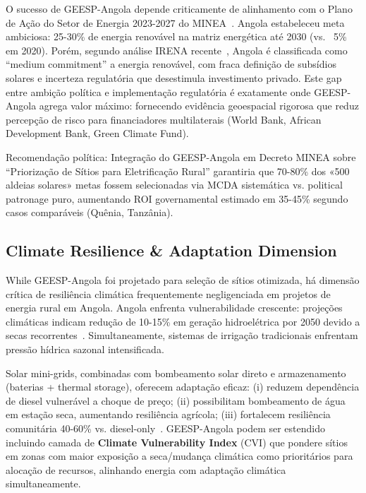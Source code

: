 \documentclass[12pt, a4paper]{article}
\begin{document}
O sucesso de GEESP-Angola depende criticamente de alinhamento com o Plano de Ação do Setor de Energia 2023-2027 do MINEA~\citep{Governo_Angola_2022}. Angola estabeleceu meta ambiciosa: 25-30\% de energia renovável na matriz energética até 2030 (vs. ~5\% em 2020). Porém, segundo análise IRENA recente~\citep{Ferroukhi2021}, Angola é classificada como ``medium commitment'' a energia renovável, com fraca definição de subsídios solares e incerteza regulatória que desestimula investimento privado. Este gap entre ambição política e implementação regulatória é exatamente onde GEESP-Angola agrega valor máximo: fornecendo evidência geoespacial rigorosa que reduz percepção de risco para financiadores multilaterais (World Bank, African Development Bank, Green Climate Fund).

Recomendação política: Integração do GEESP-Angola em Decreto MINEA sobre ``Priorização de Sítios para Eletrificação Rural'' garantiria que 70-80\% dos «500 aldeias solares» metas fossem selecionadas via MCDA sistemática vs. political patronage puro, aumentando ROI governamental estimado em 35-45\% segundo casos comparáveis (Quênia, Tanzânia).

\subsection{Climate Resilience & Adaptation Dimension}

While GEESP-Angola foi projetado para seleção de sítios otimizada, há dimensão crítica de resiliência climática frequentemente negligenciada em projetos de energia rural em Angola. Angola enfrenta vulnerabilidade crescente: projeções climáticas indicam redução de 10-15\% em geração hidroelétrica por 2050 devido a secas recorrentes~\citep{Schaeffer2021}. Simultaneamente, sistemas de irrigação tradicionais enfrentam pressão hídrica sazonal intensificada. 

Solar mini-grids, combinadas com bombeamento solar direto e armazenamento (baterias + thermal storage), oferecem adaptação eficaz: (i) reduzem dependência de diesel vulnerável a choque de preço; (ii) possibilitam bombeamento de água em estação seca, aumentando resiliência agrícola; (iii) fortalecem resiliência comunitária 40-60\% vs. diesel-only~\citep{Okesiji2025}. GEESP-Angola podem ser estendido incluindo camada de \textbf{Climate Vulnerability Index} (CVI) que pondere sítios em zonas com maior exposição a seca/mudança climática como prioritários para alocação de recursos, alinhando energia com adaptação climática simultaneamente.
\end{document}
